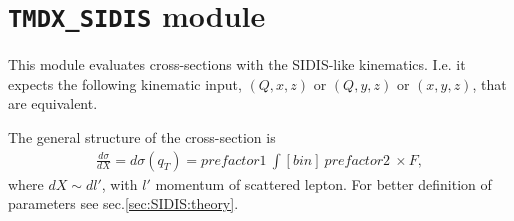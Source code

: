 \documentclass[prd,nofootinbib,eqsecnum,final]{revtex4}
\renewcommand{\(}{\left(}
\renewcommand{\)}{\right)}
\renewcommand{\[}{\left[}
\renewcommand{\]}{\right]}
\begin{document}
\newpage
\section{\texttt{TMDX{\_}SIDIS} module}
\label{TMDXs}

This module evaluates cross-sections with the SIDIS-like kinematics. I.e. it expects the following kinematic input, $(Q,x,z)$ or $(Q,y,z)$ or $(x,y,z)$, that are equivalent.

The general structure of the cross-section is
\begin{eqnarray}
\frac{d\sigma}{dX}=
d\sigma(q_T)=prefactor1~\int [bin] ~prefactor2~\times F,
\end{eqnarray}
where $dX\sim dl'$, with $l'$ momentum of scattered lepton. For better definition of parameters see sec.\ref{sec:SIDIS:theory}.
\end{document}
